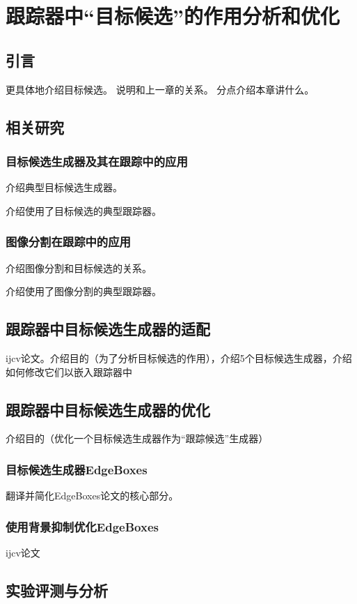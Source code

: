 \chapter{跟踪器中``目标候选''的作用分析和优化}

\section{引言}
更具体地介绍目标候选。
说明和上一章的关系。
分点介绍本章讲什么。

\section{相关研究}
\subsection{目标候选生成器及其在跟踪中的应用}
介绍典型目标候选生成器。

介绍使用了目标候选的典型跟踪器。
\subsection{图像分割在跟踪中的应用}
介绍图像分割和目标候选的关系。

介绍使用了图像分割的典型跟踪器。

\section{跟踪器中目标候选生成器的适配}
ijcv论文。介绍目的（为了分析目标候选的作用），介绍5个目标候选生成器，介绍如何修改它们以嵌入跟踪器中

\section{跟踪器中目标候选生成器的优化}
介绍目的（优化一个目标候选生成器作为``跟踪候选''生成器）
\subsection{目标候选生成器EdgeBoxes}
翻译并简化EdgeBoxes论文的核心部分。
\subsection{使用背景抑制优化EdgeBoxes}
ijcv论文


\section{实验评测与分析}
